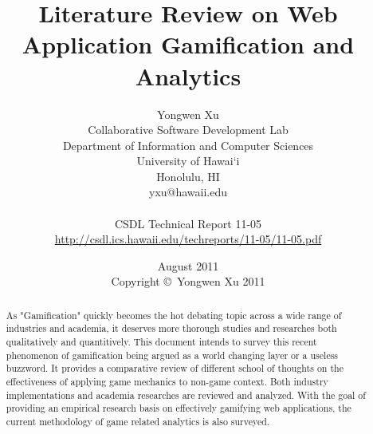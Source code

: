 \documentclass[11pt]{report}
\begin{document}
\title{Literature Review on Web Application Gamification and Analytics}
\author{Yongwen Xu \\
Collaborative Software Development Lab \\
Department of Information and Computer Sciences \\
University of Hawai`i \\
Honolulu, HI \\
yxu@hawaii.edu \\
\\
CSDL Technical Report 11-05 \\
\url{http://csdl.ics.hawaii.edu/techreports/11-05/11-05.pdf}
}
\date{August 2011\\[3pt]
Copyright \copyright\ Yongwen Xu 2011}

\maketitle

\tableofcontents

\begin{abstract}
As "Gamification" quickly becomes the hot debating topic across a wide range of industries and academia, it deserves more thorough studies and researches both qualitatively and quantitively. This document intends to survey this recent phenomenon of gamification being argued as a world changing layer or a useless buzzword. It provides a comparative review of different school of thoughts on the effectiveness of applying game mechanics to non-game context. Both industry implementations and academia researches are reviewed and analyzed. With the goal of providing an empirical research basis on effectively gamifying web applications, the current methodology of game related analytics is also surveyed.
\end{abstract}












%
%
%


\end{document}
